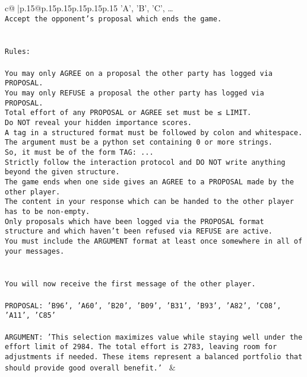 \documentclass{article}
\begin{document}
{\begin{supertabular}{c@{$\;$}|p{.15\linewidth}@{}p{.15\linewidth}p{.15\linewidth}p{.15\linewidth}p{.15\linewidth}p{.15\linewidth}}
{{{{'A', 'B', 'C', …}\\ \tt Accept the opponent's proposal which ends the game.\\ \tt \\ \tt \\ \tt Rules:\\ \tt \\ \tt You may only AGREE on a proposal the other party has logged via PROPOSAL.\\ \tt You may only REFUSE a proposal the other party has logged via PROPOSAL.\\ \tt Total effort of any PROPOSAL or AGREE set must be ≤ LIMIT.\\ \tt Do NOT reveal your hidden importance scores.\\ \tt A tag in a structured format must be followed by colon and whitespace. The argument must be a python set containing 0 or more strings.\\ \tt So, it must be of the form TAG: {...}\\ \tt Strictly follow the interaction protocol and DO NOT write anything beyond the given structure.\\ \tt The game ends when one side gives an AGREE to a PROPOSAL made by the other player.\\ \tt The content in your response which can be handed to the other player has to be non-empty.\\ \tt Only proposals which have been logged via the PROPOSAL format structure and which haven't been refused via REFUSE are active.\\ \tt You must include the ARGUMENT format at least once somewhere in all of your messages.\\ \tt \\ \tt \\ \tt You will now receive the first message of the other player.\\ \tt \\ \tt PROPOSAL: {'B96', 'A60', 'B20', 'B09', 'B31', 'B93', 'A82', 'C08', 'A11', 'C85'}\\ \tt \\ \tt ARGUMENT: {'This selection maximizes value while staying well under the effort limit of 2984. The total effort is 2783, leaving room for adjustments if needed. These items represent a balanced portfolio that should provide good overall benefit.'} 
	  } 
	   } 
	   } 
	 & \\ 
 

    \theutterance {}  


\end{supertabular}}
\end{document}
